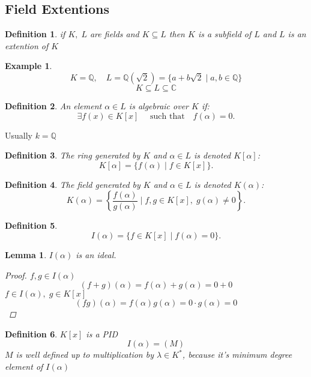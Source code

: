 \documentclass[12pt]{article}
\def\CC{\mathbb{C}}
\def\QQ{\mathbb{Q}}
\newtheorem{lemma}[theorem]{Lemma}
\newtheorem{definition}{Definition}[section]
\newtheorem{example}{Example}[section]
\begin{document}
\subsection{Field Extentions}

\begin{definition}
if $K, \; L$ are fields and $K \subseteq L$ then $K$ is a subfield of $L$ and $L$ is an extention of $K$
\end{definition}

\begin{example}
\[K= \QQ , \quad L=\QQ (\sqrt{2}) = \{a + b\sqrt{2} \; | \;a,b \in \QQ\}\]
\[K \subseteq L \subseteq \CC\]
\end{example}

\begin{definition}
An element $\alpha \in L$ is algebraic over $K$ if:
\[ \exists f(x) \in K[x] \quad \text{ such that}\quad f(\alpha )=0.\]
\end{definition}
Usually $k= \QQ$

\begin{definition}
The ring generated by $K$ and $\alpha \in L$ is denoted $K[\alpha ]$:
\[  K[\alpha ] = \{f(\alpha ) \; |\; f \in K[x] \}.\]
\end{definition}

\begin{definition}
The field generated by $K$ and $\alpha \in L$ is denoted $K(\alpha )$:
\[  K(\alpha ) = \left\{ \frac{f(\alpha )}{g(\alpha )} \; |\; f,g \in K[x], \; g(\alpha ) \neq 0 \right\}.\]
\end{definition}

\begin{definition}
\[  I(\alpha ) = \{ f \in K[x] \; | \; f(\alpha ) = 0 \}.\]
\end{definition}

\begin{lemma} $I(\alpha )$ is an ideal.
\begin{proof}$ f,g \in I(\alpha ) $
\[(f+g)(\alpha ) = f(\alpha) +  g(\alpha) = 0+0\]
$ f \in I(\alpha ), \; g \in K[x] $
\[(fg)(\alpha ) = f(\alpha )g(\alpha ) = 0 \cdot g(\alpha ) =0 \]
\end{proof}
\end{lemma}

\begin{definition}
$K[x]$ is a PID
\[I(\alpha ) = (M)\]
$M$ is well defined up to multiplication by $\lambda \in K^*$, because it's minimum degree element of $I(\alpha )$
\end{definition}
\end{document}
